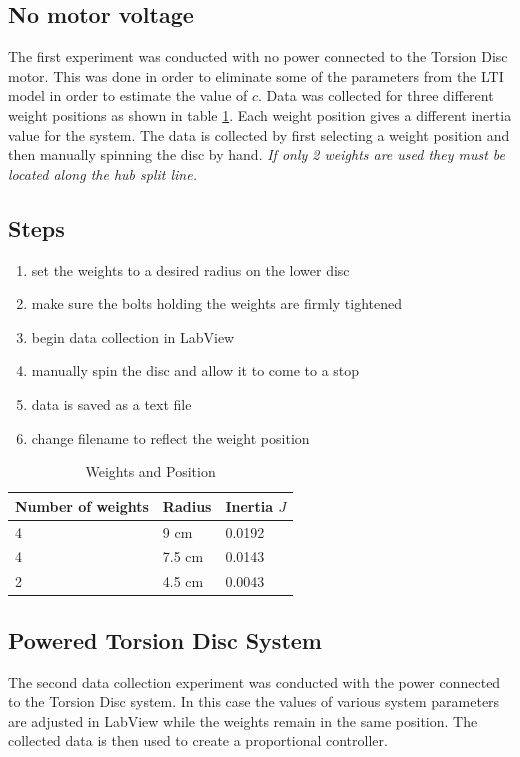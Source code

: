 \documentclass[11pt,titlepage]{article}
\begin{document}
	\subsection{No motor voltage}
		The first experiment was conducted with no power connected to the Torsion Disc motor. This was done in order to eliminate some of the parameters from the LTI model in order to estimate the value of $c$. Data was collected for three different weight positions as shown in table \ref{table:weight_pos}. Each weight position gives a different inertia value for the system. The data is collected by first selecting a weight position and then manually spinning the disc by hand. \emph{If only 2 weights are used they must be located along the hub split line.}
	\subsection*{Steps}
		\begin{enumerate}
			\item set the weights to a desired radius on the lower disc
			\item make sure the bolts holding the weights are firmly tightened
			\item begin data collection in LabView
			\item manually spin the disc and allow it to come to a stop
			\item data is saved as a text file
			\item change filename to reflect the weight position
		\end{enumerate}
		\begin{table}[h!]
			\centering
			\begin{tabular}{|m{4cm}|m{3cm}|m{3cm}|} 
				\hline
				Number of weights & Radius & Inertia $J$ \\ 
				\hline
				4 & 9 cm & 0.0192 \\
				\hline
				4 & 7.5 cm & 0.0143\\
				\hline
				2 & 4.5 cm & 0.0043 \\
				\hline
			\end{tabular}
			\caption{Weights and Position} \label{table:weight_pos}
		\end{table}
	\subsection{Powered Torsion Disc System}
	The second data collection experiment was conducted with the power connected to the Torsion Disc system. In this case the values of various system parameters are adjusted in LabView while the weights remain in the same position. The collected data is then used to create a proportional controller.
\end{document}
